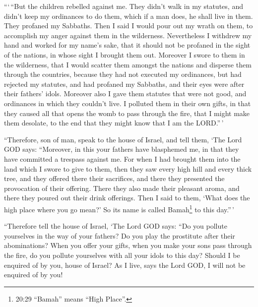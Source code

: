  ```\,``But the children rebelled against me. They didn't
walk in my statutes, and didn't keep my ordinances to do them, which if
a man does, he shall live in them. They profaned my Sabbaths. Then I
said I would pour out my wrath on them, to accomplish my anger against
them in the wilderness.  Nevertheless I withdrew my hand
and worked for my name's sake, that it should not be profaned in the
sight of the nations, in whose sight I brought them out. 
Moreover I swore to them in the wilderness, that I would scatter them
amongst the nations and disperse them through the countries,
 because they had not executed my ordinances, but had
rejected my statutes, and had profaned my Sabbaths, and their eyes were
after their fathers' idols.  Moreover also I gave them
statutes that were not good, and ordinances in which they couldn't live.
 I polluted them in their own gifts, in that they caused
all that opens the womb to pass through the fire, that I might make them
desolate, to the end that they might know that I am the LORD.''\,'

 ``Therefore, son of man, speak to the house of Israel, and
tell them, `The Lord GOD says: ``Moreover, in this your fathers have
blasphemed me, in that they have committed a trespass against me.
 For when I had brought them into the land which I swore to
give to them, then they saw every high hill and every thick tree, and
they offered there their sacrifices, and there they presented the
provocation of their offering. There they also made their pleasant
aroma, and there they poured out their drink offerings. 
Then I said to them, `What does the high place where you go mean?' So
its name is called Bamah\footnote{20:29 ``Bamah'' means ``High Place''.}
to this day.''\,'

 ``Therefore tell the house of Israel, `The Lord GOD says:
``Do you pollute yourselves in the way of your fathers? Do you play the
prostitute after their abominations?  When you offer your
gifts, when you make your sons pass through the fire, do you pollute
yourselves with all your idols to this day? Should I be enquired of by
you, house of Israel? As I live, says the Lord GOD, I will not be
enquired of by you!

